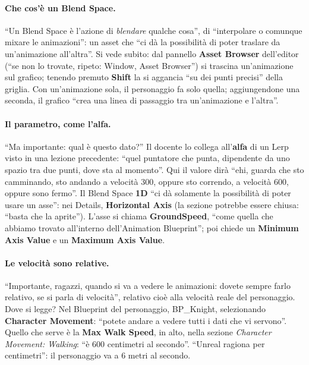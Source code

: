 \paragraph{Che cos'è un Blend Space.} ``Un Blend Space è l'azione di \emph{blendare}
qualche cosa'', di ``interpolare o comunque mixare le animazioni'': un asset che ``ci dà
la possibilità di poter traslare da un'animazione all'altra''. Si vede subito: dal
pannello \textbf{Asset Browser} dell'editor (``se non lo trovate, ripeto: Window, Asset
Browser'') si trascina un'animazione sul grafico; tenendo premuto \textbf{Shift} la si
aggancia ``su dei punti precisi'' della griglia. Con un'animazione sola, il personaggio
fa solo quella; aggiungendone una seconda, il grafico ``crea una linea di passaggio tra
un'animazione e l'altra''.

\paragraph{Il parametro, come l'alfa.} ``Ma importante: qual è questo dato?'' Il docente
lo collega all'\textbf{alfa} di un Lerp visto in una lezione precedente: ``quel puntatore
che punta, dipendente da uno spazio tra due punti, dove sta al momento''. Qui il valore
dirà ``ehi, guarda che sto camminando, sto andando a velocità 300, oppure sto correndo, a
velocità 600, oppure sono fermo''. Il Blend Space \textbf{1D} ``ci dà solamente la
possibilità di poter usare un asse'': nei Details, \textbf{Horizontal Axis} (la sezione
potrebbe essere chiusa: ``basta che la aprite''). L'asse si chiama \textbf{GroundSpeed},
``come quella che abbiamo trovato all'interno dell'Animation Blueprint''; poi chiede un
\textbf{Minimum Axis Value} e un \textbf{Maximum Axis Value}.

\paragraph{Le velocità sono relative.} ``Importante, ragazzi, quando si va a vedere le
animazioni: dovete sempre farlo relativo, se si parla di velocità'', relativo cioè alla
velocità reale del personaggio. Dove si legge? Nel Blueprint del personaggio,
BP\_Knight, selezionando \textbf{Character Movement}: ``potete andare a vedere tutti i
dati che vi servono''. Quello che serve è la \textbf{Max Walk Speed}, in alto, nella
sezione \emph{Character Movement: Walking}: ``è 600 centimetri al secondo''. ``Unreal
ragiona per centimetri'': il personaggio va a 6 metri al secondo.

